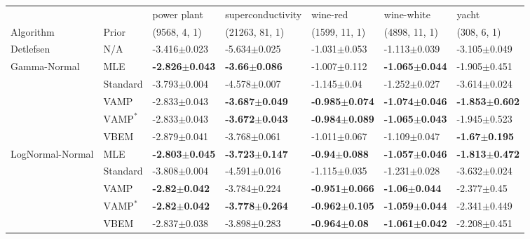 \begin{tabular}{lllllll}
\midrule
                 &      &                power plant &          superconductivity &                   wine-red &                 wine-white &                      yacht \\
Algorithm & Prior& (9568, 4, 1)& (21263, 81, 1)& (1599, 11, 1)& (4898, 11, 1)& (308, 6, 1)\\
\midrule
Detlefsen & N/A &           -3.416$\pm$0.023 &           -5.634$\pm$0.025 &           -1.031$\pm$0.053 &           -1.113$\pm$0.039 &           -3.105$\pm$0.049 \\
Gamma-Normal & MLE &  \textbf{-2.826$\pm$0.043} &   \textbf{-3.66$\pm$0.086} &           -1.007$\pm$0.112 &  \textbf{-1.065$\pm$0.044} &           -1.905$\pm$0.451 \\
                 & Standard &           -3.793$\pm$0.004 &           -4.578$\pm$0.007 &            -1.145$\pm$0.04 &           -1.252$\pm$0.027 &           -3.614$\pm$0.024 \\
                 & VAMP &           -2.833$\pm$0.043 &  \textbf{-3.687$\pm$0.049} &  \textbf{-0.985$\pm$0.074} &  \textbf{-1.074$\pm$0.046} &  \textbf{-1.853$\pm$0.602} \\
                 & $\text{VAMP}^*$ &           -2.833$\pm$0.043 &  \textbf{-3.672$\pm$0.043} &  \textbf{-0.984$\pm$0.089} &  \textbf{-1.065$\pm$0.043} &           -1.945$\pm$0.523 \\
                 & VBEM &           -2.879$\pm$0.041 &           -3.768$\pm$0.061 &           -1.011$\pm$0.067 &           -1.109$\pm$0.047 &   \textbf{-1.67$\pm$0.195} \\
LogNormal-Normal & MLE &  \textbf{-2.803$\pm$0.045} &  \textbf{-3.723$\pm$0.147} &   \textbf{-0.94$\pm$0.088} &  \textbf{-1.057$\pm$0.046} &  \textbf{-1.813$\pm$0.472} \\
                 & Standard &           -3.808$\pm$0.004 &           -4.591$\pm$0.016 &           -1.115$\pm$0.035 &           -1.231$\pm$0.028 &           -3.632$\pm$0.024 \\
                 & VAMP &   \textbf{-2.82$\pm$0.042} &           -3.784$\pm$0.224 &  \textbf{-0.951$\pm$0.066} &   \textbf{-1.06$\pm$0.044} &            -2.377$\pm$0.45 \\
                 & $\text{VAMP}^*$ &   \textbf{-2.82$\pm$0.042} &  \textbf{-3.778$\pm$0.264} &  \textbf{-0.962$\pm$0.105} &  \textbf{-1.059$\pm$0.044} &           -2.341$\pm$0.449 \\
                 & VBEM &           -2.837$\pm$0.038 &           -3.898$\pm$0.283 &   \textbf{-0.964$\pm$0.08} &  \textbf{-1.061$\pm$0.042} &           -2.208$\pm$0.451 \\
\bottomrule
\end{tabular}

